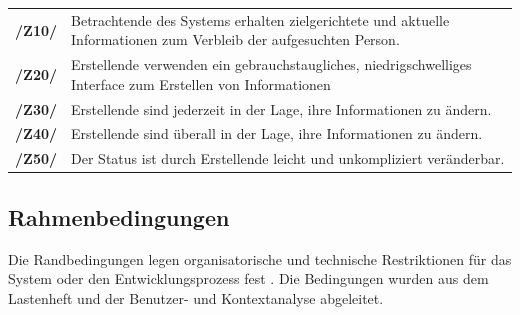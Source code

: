 \begin{center}
        \renewcommand{\arraystretch}{1.5}
        \begin{tabular}{p{}p{}}
                \hline
                \textbf{/Z10/} & Betrachtende des Systems erhalten zielgerichtete und aktuelle
                Informationen zum Verbleib der aufgesuchten Person.                                                                          \\
                \textbf{/Z20/} & Erstellende verwenden ein gebrauchstaugliches, niedrigschwelliges Interface zum Erstellen von Informationen \\
                \textbf{/Z30/} & Erstellende sind jederzeit in der Lage, ihre Informationen zu ändern.                                       \\
                \textbf{/Z40/} & Erstellende sind überall in der Lage, ihre Informationen zu ändern.                                         \\
                \textbf{/Z50/} & Der Status ist durch Erstellende leicht und unkompliziert veränderbar.                                      \\
                \hline
        \end{tabular}
\end{center}

\subsection*{Rahmenbedingungen}
\label{section:rahmen}
Die Randbedingungen legen organisatorische und technische Restriktionen für das System oder den
Entwicklungsprozess fest \cite{balzert2009}. Die Bedingungen wurden aus dem Lastenheft und der
Benutzer- und Kontextanalyse abgeleitet.

